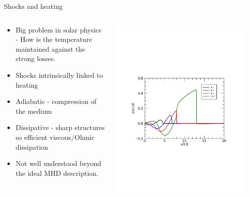 \documentclass[10pt,aspectratio=169,usenames,dvipsnames]{beamer}
\begin{document}
\begin{frame}{Shocks and heating}
\begin{columns}
\begin{column}{0.5\textwidth}
\begin{itemize}
    \item Big problem in solar physics - How is the temperature maintained against the strong losses.
    \item Shocks intrinsically linked to heating
    \item Adiabatic - compression of the medium
    \item Dissipative - sharp structures so efficient viscous/Ohmic dissipation
    \item Not well understood beyond the ideal MHD description.
\end{itemize}
\end{column}
\begin{column}{0.5\textwidth}
\includegraphics[width=0.95\textwidth, trim=2cm 7cm 2cm 8cm,clip]{2023ECRW/Figures/steepening.pdf} \\

\end{column}
\end{columns}
\end{frame}
\end{document}
